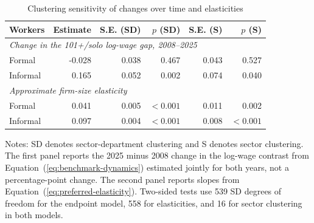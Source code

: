 \begin{table}[htbp]
  \centering
  \caption{Clustering sensitivity of changes over time and elasticities}
  \label{tab:preferred-extension-clustering}
  \small
  \begin{tabular}{lrrrrr}
    \toprule
    Workers & Estimate & S.E. (SD) & $p$ (SD) & S.E. (S) & $p$ (S) \\
    \midrule
    \multicolumn{6}{l}{\textit{Change in the 101+/solo log-wage gap, 2008--2025}} \\
    Formal & -0.028 & 0.038 & 0.467 & 0.043 & 0.527 \\
    Informal & 0.165 & 0.052 & 0.002 & 0.074 & 0.040 \\
    \midrule
    \multicolumn{6}{l}{\textit{Approximate firm-size elasticity}} \\
    Formal & 0.041 & 0.005 & $<0.001$ & 0.011 & 0.002 \\
    Informal & 0.097 & 0.004 & $<0.001$ & 0.008 & $<0.001$ \\
    \bottomrule
  \end{tabular}
  \vspace{0.3em}
  \begin{minipage}{0.95\textwidth}
  \footnotesize
  Notes: SD denotes sector-department clustering and S denotes sector clustering. The first panel reports the 2025 minus 2008 change in the log-wage contrast from Equation~(\ref{eq:benchmark-dynamics}) estimated jointly for both years, not a percentage-point change. The second panel reports slopes from Equation~(\ref{eq:preferred-elasticity}). Two-sided tests use 539 SD degrees of freedom for the endpoint model, 558 for elasticities, and 16 for sector clustering in both models.
  \end{minipage}
\end{table}
